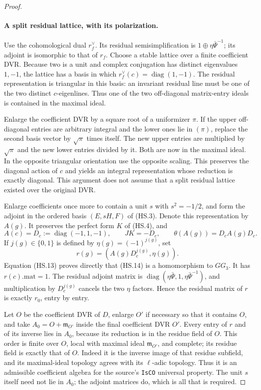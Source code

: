 \begin{proof}
\paragraph{A split residual lattice, with its polarization.}
Use the cohomological dual $r_f^\vee$.  Its residual
semisimplification is $1\oplus\eta\bar\Psi^{-1}$; its
adjoint is isomorphic to that of $r_f$.  Choose a stable
lattice over a finite coefficient DVR.  Because two is a
unit and complex conjugation has distinct eigenvalues
$1,-1$, the lattice has a basis in which
$r_f^\vee(c)=\operatorname{diag}(1,-1)$.  The residual
representation is triangular in this basis: an invariant
residual line must be one of the two distinct $c$-eigenlines.
Thus one of the two off-diagonal matrix-entry ideals is
contained in the maximal ideal.

Enlarge the coefficient DVR by a square root of a uniformizer
$\pi$.  If the upper off-diagonal entries are arbitrary
integral and the lower ones lie in $(\pi)$, replace the
second basis vector by $\sqrt\pi$ times itself.  The new
upper entries are multiplied by $\sqrt\pi$ and the new
lower entries divided by it.  Both are now in the maximal
ideal.  In the opposite triangular orientation use the
opposite scaling.  This preserves the diagonal action of
$c$ and yields an integral representation whose reduction
is exactly diagonal.  This argument does not assume that
a split residual lattice existed over the original DVR.

Enlarge coefficients once more to contain a unit $s$ with
$s^2=-1/2$, and form the adjoint in the ordered basis
$(E,sH,F)$ of (HS.3).  Denote this representation by $A(g)$.
It preserves the perfect form $K$ of (HS.4), and
\[
 A(c)=D_c:=\operatorname{diag}(-1,1,-1),\qquad
 JK=-D_c,\qquad\theta(A(g))=D_cA(g)D_c.                    \tag{HS.13}
\]
If $j(g)\in\{0,1\}$ is defined by
$\eta(g)=(-1)^{j(g)}$, set
\[
                 r(g)=(A(g)D_c^{j(g)},\eta(g)).              \tag{HS.14}
\]
Equation (HS.13) proves directly that (HS.14) is a
homomorphism to $GG_3$.  It has $r(c).\mathrm{mat}=1$.
The residual adjoint matrix is
$\operatorname{diag}(\eta\bar\Psi,1,
\eta\bar\Psi^{-1})$, and multiplication by $D_c^{j(g)}$
cancels the two $\eta$ factors.  Hence the residual matrix
of $r$ is exactly $r_0$, entry by entry.

Let $O$ be the coefficient DVR of $D$, enlarge $O'$ if necessary
so that it contains $O$, and take
$A_0=O+\mathfrak m_{O'}$ inside the final coefficient DVR $O'$.
Every entry of $r$ and of its inverse lies in $A_0$, because
its reduction is in the residue field of $O$.
This order is finite over $O$, local with maximal ideal
$\mathfrak m_{O'}$, and complete; its residue field is exactly
that of $O$.  Indeed it is the inverse image of that residue
subfield, and its maximal-ideal topology agrees with its
$\ell$-adic topology.  Thus it is an admissible coefficient
algebra for the source's \texttt{IsCO} universal property.
The unit $s$ itself need not lie in $A_0$; the adjoint
matrices do, which is all that is required.


\end{proof}
